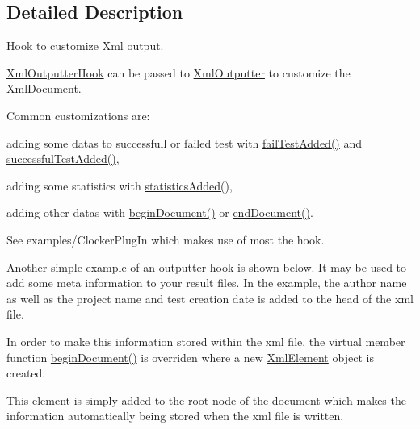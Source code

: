\subsection{Detailed Description}
Hook to customize Xml output. 

\hyperlink{class_xml_outputter_hook}{Xml\-Outputter\-Hook} can be passed to \hyperlink{class_xml_outputter}{Xml\-Outputter} to customize the \hyperlink{class_xml_document}{Xml\-Document}.

Common customizations are\-:
\begin{DoxyItemize}
\item adding some datas to successfull or failed test with \hyperlink{class_xml_outputter_hook_a77310985e055cc2c67e91a42c524fbbe}{fail\-Test\-Added()} and \hyperlink{class_xml_outputter_hook_adbcf6ad2cb85d6f1015306fadb7eadcf}{successful\-Test\-Added()},
\item adding some statistics with \hyperlink{class_xml_outputter_hook_a0e602260274d4f005affb4ee84ce4c4a}{statistics\-Added()},
\item adding other datas with \hyperlink{class_xml_outputter_hook_a1d2b5d5d0fc42d273d6430522a70ccbb}{begin\-Document()} or \hyperlink{class_xml_outputter_hook_a300e2a4ef46db4e76428e32f7c7e6a23}{end\-Document()}.
\end{DoxyItemize}

See examples/\-Clocker\-Plug\-In which makes use of most the hook.

Another simple example of an outputter hook is shown below. It may be used to add some meta information to your result files. In the example, the author name as well as the project name and test creation date is added to the head of the xml file.

In order to make this information stored within the xml file, the virtual member function \hyperlink{class_xml_outputter_hook_a1d2b5d5d0fc42d273d6430522a70ccbb}{begin\-Document()} is overriden where a new \hyperlink{class_xml_element}{Xml\-Element} object is created.

This element is simply added to the root node of the document which makes the information automatically being stored when the xml file is written.


